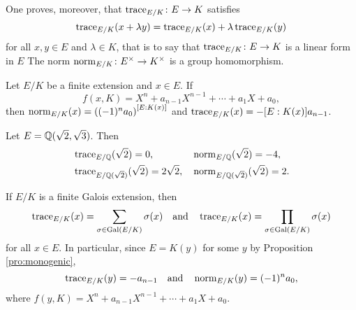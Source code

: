 One proves, moreover, that  
$\operatorname{trace}_{E/K}\colon E\to K$ 
satisfies
\[
\operatorname{trace}_{E/K}(x+\lambda y)=
\operatorname{trace}_{E/K}(x)+\lambda\operatorname{trace}_{E/K}(y)
\]
for all $x,y\in E$ and $\lambda\in K$, that is to say that 
$\operatorname{trace}_{E/K}\colon E\to K$ 
is a 
linear form in $E$ The norm  
$\operatorname{norm}_{E/K}\colon E^{\times}\to K^{\times}$ 
is a group homomorphism. 

\begin{exercise}
        Let $E/K$ be a finite extension and
        $x\in E$. If
        \[
        f(x,K)=X^n+a_{n-1}X^{n-1}+\cdots+a_1X+a_0,
        \]
        then 
        $\operatorname{norm}_{E/K}(x)=\left((-1)^na_0\right)^{[E:K(x)]}$ and 
        $\operatorname{trace}_{E/K}(x)=-[E:K(x)]a_{n-1}$. 
\end{exercise}

\begin{example}
    Let $E=\mathbb{Q}(\sqrt{2},\sqrt{3})$. Then 
    \begin{align*}
    &\operatorname{trace}_{E/\mathbb{Q}}(\sqrt{2})=0,
    &&
    \operatorname{norm}_{E/\mathbb{Q}}(\sqrt{2})=-4,\\
    &\operatorname{trace}_{E/\mathbb{Q}(\sqrt{2})}(\sqrt{2})=2\sqrt{2},
    &&\operatorname{norm}_{E/\mathbb{Q}(\sqrt{2})}(\sqrt{2})=2.    
    \end{align*}
\end{example}

\begin{example}
    If $E/K$ is a finite Galois extension, then 
    \[
    \operatorname{trace}_{E/K}(x)=\sum_{\sigma\in\operatorname{Gal}(E/K)}\sigma(x)
    \quad\text{and}\quad
    \operatorname{trace}_{E/K}(x)=\prod_{\sigma\in\operatorname{Gal}(E/K)}\sigma(x)
    \]
    for all $x\in E$. In particular, since $E=K(y)$ for some
    $y$ by Proposition \ref{pro:monogenic}, 
    \[
    \operatorname{trace}_{E/K}(y)=-a_{n-1}
    \quad\text{and}\quad
    \operatorname{norm}_{E/K}(y)=(-1)^na_0,
    \]
    where
    $f(y,K)=X^n+a_{n-1}X^{n-1}+\cdots+a_1X+a_0$.
\end{example}        

